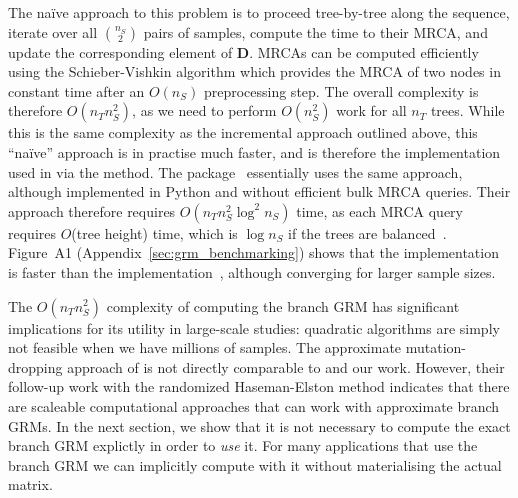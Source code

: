 The na{\"i}ve approach to this problem 
is to proceed tree-by-tree along the sequence,
iterate over all $\binom{n_S}{2}$ pairs of samples, compute the 
time to their MRCA, and update the corresponding element of $\mathbf{D}$.
MRCAs can be computed efficiently using the Schieber-Vishkin
algorithm \citep{Schieber1988On,knuth2011combinatorial}
which provides the MRCA of two nodes in constant time
after an $O(n_S)$ preprocessing step.
The overall complexity is therefore $O(n_T n_S^2)$,
as we need to perform $O(n_S^2)$ work for all $n_T$ trees.
While this is the same complexity as the incremental approach outlined
above, this ``na{\"i}ve'' approach is in practise much faster, and 
is therefore the implementation used in \tskit{} via the \tsGRM{} method.
The \eGRM{} package~\citet{fan2022genealogical} essentially uses the same approach,
although implemented in Python and without efficient bulk MRCA queries.
Their approach therefore requires $O(n_T n_S^2 \log^2{n_S})$ time, 
as each MRCA query requires $O$(tree height) time, which is $\log n_S$
if the trees are balanced~\citep{kelleher2016efficient}.
Figure~A1 (Appendix~\ref{sec:grm_benchmarking}) shows that the \tskit{} implementation 
is faster than the \eGRM{}
implementation~\citep{fan2022genealogical},
although converging for larger sample sizes.

The $O(n_T n_S^2)$ complexity of computing the branch GRM
has significant implications for its utility in large-scale studies:
quadratic algorithms are simply not feasible when we have millions 
of samples.
The approximate mutation-dropping approach of \citet{zhang2023biobank}
is not directly comparable to \citet{fan2022genealogical} and our work.
However, their follow-up work with the randomized Haseman-Elston method \citep{zhu2024variance}
indicates that there are scaleable computational approaches that can
work with approximate branch GRMs.
In the next section, we show that it is not necessary
to compute the exact branch GRM explictly in order to \emph{use} it.
For many applications that use the branch GRM we can implicitly compute with it
without materialising the actual matrix.


